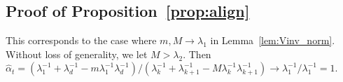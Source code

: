 %
%
%
%
\endproof



\subsection{Proof of Proposition~\ref{prop:align}}
\label{proof:align}
\proof{}
	This corresponds to the case where $m, M \to \lambda_1$ in Lemma~\ref{lem:Vinv_norm}.
	Without loss of generality, we let $M>\lambda_2$. Then
	$
	\hat{\alpha}_t  =(\lambda_{1}^{-1} + \lambda_{d}^{-1}   - m{\lambda_{1}^{-1}\lambda_{d}^{-1} })/(\lambda_{k}^{-1} +  \lambda_{k+1}^{-1}   - {M}{\lambda_{k}^{-1}\lambda_{k+1}^{-1} } ) \to \lambda_{1}^{-1}/\lambda_{1}^{-1} = 1
	$. 
\endproof







